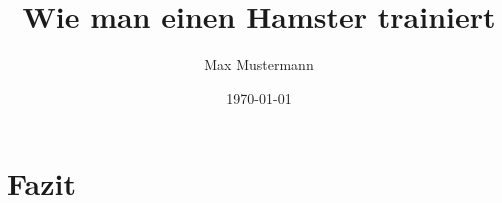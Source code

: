 \documentclass[ a4paper,
                oneside,
                toc=bibliography,
                toc=listof
                ]{scrbook}
\author{Max Mustermann}
\title{Wie man einen Hamster trainiert}
\date{\today}
\begin{document}
 
    \frontmatter
    \makeISWtitle

    \declarationOfOriginality

    
    \cleardoublepage
    \tableofcontents
    

    \mainmatter



    
    
    
    \chapter{Fazit}


    \backmatter
    \cleardoublepage
    \printbibliography

    \cleardoublepage
    \listoffigures
    \cleardoublepage
    \listoftables
    \cleardoublepage
    

\end{document}
